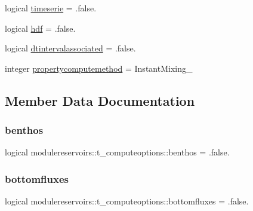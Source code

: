 \begin{DoxyCompactItemize}
\item 
logical \mbox{\hyperlink{structmodulereservoirs_1_1t__computeoptions_af7e0c753e5f3db9db82b65a412c29ab1}{timeserie}} = .false.
\item 
logical \mbox{\hyperlink{structmodulereservoirs_1_1t__computeoptions_a1826f48af18340c360c8795cea13793a}{hdf}} = .false.
\item 
logical \mbox{\hyperlink{structmodulereservoirs_1_1t__computeoptions_a6d710a261e0c8aa30a343939a346ce79}{dtintervalassociated}} = .false.
\item 
integer \mbox{\hyperlink{structmodulereservoirs_1_1t__computeoptions_ae1553550bda412ed203a59f10c52b81b}{propertycomputemethod}} = Instant\+Mixing\+\_\+
\end{DoxyCompactItemize}


\subsection{Member Data Documentation}
\mbox{\label{structmodulereservoirs_1_1t__computeoptions_a9d9d6b84895cfdfd8bdad79bb1ba731e}} 
\subsubsection{\texorpdfstring{benthos}{benthos}}
{\footnotesize\ttfamily logical modulereservoirs\+::t\+\_\+computeoptions\+::benthos = .false.\hspace{0.3cm}{\ttfamily [private]}}

\mbox{\label{structmodulereservoirs_1_1t__computeoptions_a8304523044edb9c7da520c9ee0d894ed}} 
\subsubsection{\texorpdfstring{bottomfluxes}{bottomfluxes}}
{\footnotesize\ttfamily logical modulereservoirs\+::t\+\_\+computeoptions\+::bottomfluxes = .false.\hspace{0.3cm}{\ttfamily [private]}}

